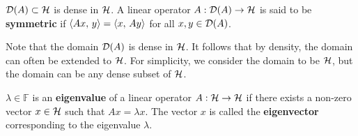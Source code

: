 \begin{definition}
    $\mathcal{D}(A)\subset\mathcal{H}$ is dense in $\mathcal{H}$. A linear operator $A:\mathcal{D}(A)\to\mathcal{H}$ is 
    said to be \textbf{symmetric} if $\left\langle {Ax},\, {y} \right\rangle = \left\langle {x},\, {Ay} \right\rangle$ for all 
    $x,y\in\mathcal{D}(A)$.
\end{definition}
\begin{remark}
    Note that the domain $\mathcal{D}(A)$ is dense in $\mathcal{H}$. It follows that by density, 
    the domain can often be extended to $\mathcal{H}$. For simplicity, we consider 
    the domain to be $\mathcal{H}$, but the domain can be any dense subset of $\mathcal{H}$.
\end{remark}

\begin{definition}
    $\lambda\in\mathbb{F}$ is an \textbf{eigenvalue} of a linear operator 
    $A:\mathcal{H}\to\mathcal{H}$ if there exists a non-zero vector $x\in\mathcal{H}$ such that 
    $Ax = \lambda x$. The vector $x$ is called the \textbf{eigenvector} 
    corresponding to the eigenvalue $\lambda$.
\end{definition} 

